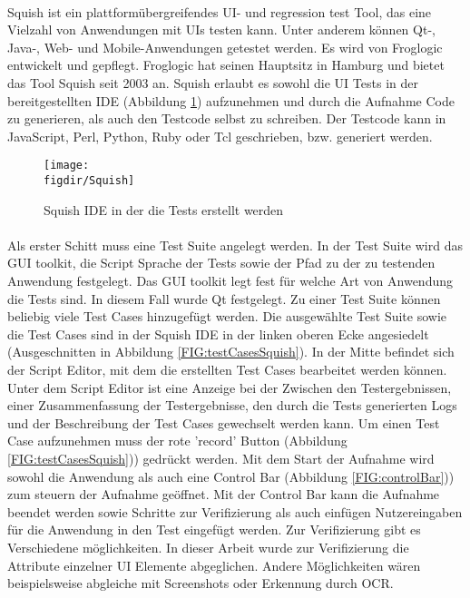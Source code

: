 		\paragraph{} Squish ist ein plattformübergreifendes UI- und regression test Tool, das eine Vielzahl von Anwendungen mit UIs testen kann. Unter anderem können Qt-, Java-, Web- und Mobile-Anwendungen getestet werden. Es wird von Froglogic entwickelt und gepflegt. Froglogic hat seinen Hauptsitz in Hamburg und bietet das Tool Squish seit 2003 an\cite{Squish}. Squish erlaubt es sowohl die UI Tests in der bereitgestellten IDE (Abbildung \ref{FIG:Squish}) aufzunehmen und durch die Aufnahme Code zu generieren, als auch den Testcode selbst zu schreiben. Der Testcode kann in JavaScript, Perl, Python, Ruby oder Tcl geschrieben, bzw. generiert werden.
		
		\begin{figure}[t]		
			\centering
			\texttt{[image: \\figdir/Squish]}
			
			\caption[Squish IDE]
			{Squish IDE in der die Tests erstellt werden}
			\label{FIG:Squish}
		\end{figure}
		\FloatBarrier
		
		\paragraph{} Als erster Schitt muss eine Test Suite angelegt werden. In der Test Suite wird das GUI toolkit, die Script Sprache der Tests sowie der Pfad zu der zu testenden Anwendung festgelegt. Das GUI toolkit legt fest für welche Art von Anwendung die Tests sind. In diesem Fall wurde Qt festgelegt. Zu einer Test Suite können beliebig viele Test Cases hinzugefügt werden. Die ausgewählte Test Suite sowie die Test Cases sind in der Squish IDE in der linken oberen Ecke angesiedelt (Ausgeschnitten in Abbildung \ref{FIG:testCasesSquish}). In der Mitte befindet sich der Script Editor, mit dem die erstellten Test Cases bearbeitet werden können. Unter dem Script Editor ist eine Anzeige bei der Zwischen den Testergebnissen, einer Zusammenfassung der Testergebnisse, den durch die Tests generierten Logs und der Beschreibung der Test Cases gewechselt werden kann. Um einen Test Case aufzunehmen muss der rote 'record' Button (Abbildung \ref{FIG:testCasesSquish})) gedrückt werden. Mit dem Start der Aufnahme wird sowohl die Anwendung als auch eine Control Bar (Abbildung \ref{FIG:controlBar})) zum steuern der Aufnahme geöffnet. Mit der Control Bar kann die Aufnahme beendet werden sowie Schritte zur Verifizierung als auch einfügen Nutzereingaben für die Anwendung in den Test eingefügt werden. Zur Verifizierung gibt es Verschiedene möglichkeiten. In dieser Arbeit wurde zur Verifizierung die Attribute einzelner UI Elemente abgeglichen. Andere Möglichkeiten wären beispielsweise abgleiche mit Screenshots oder Erkennung durch OCR.
		
